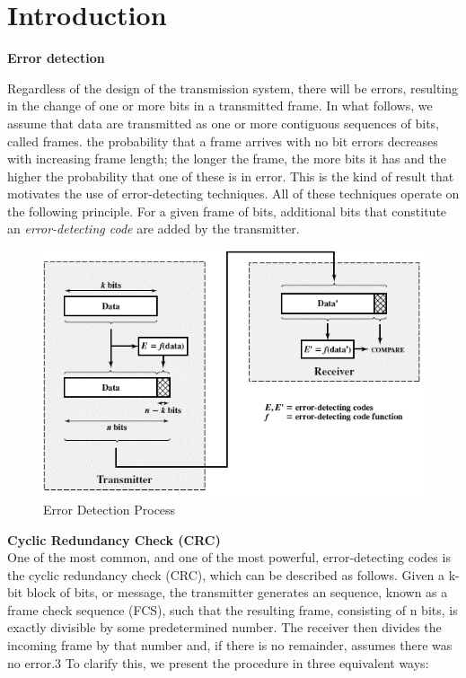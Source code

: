 \section{Introduction}

\textbf{Error detection}

Regardless of the design of the transmission system, there will be errors, resulting
in the change of one or more bits in a transmitted frame. In what follows, we assume that data are transmitted as one or more contiguous sequences of bits,
called frames. 
the probability that a frame arrives with no bit
errors decreases with increasing frame length; the longer the frame, the more bits it
has and the higher the probability that one of these is in error. This is the kind of result that motivates the use of error-detecting techniques. All
of these techniques operate on the following principle. For a given frame
of bits, additional bits that constitute an \emph{error-detecting code} are added by the transmitter.

\begin{figure}[!htbp]
	\centering
	\includegraphics [scale=0.55]{images/Intro/Imagen1.png}
	\caption{Error Detection Process}
\end{figure}



\textbf{Cyclic Redundancy Check (CRC)}\\

One of the most common, and one of the most powerful, error-detecting codes is the
cyclic redundancy check (CRC), which can be described as follows. Given a k-bit
block of bits, or message, the transmitter generates an sequence, known
as a frame check sequence (FCS), such that the resulting frame, consisting of n bits,
is exactly divisible by some predetermined number. The receiver then divides the
incoming frame by that number and, if there is no remainder, assumes there was no
error.3
To clarify this, we present the procedure in three equivalent ways:

